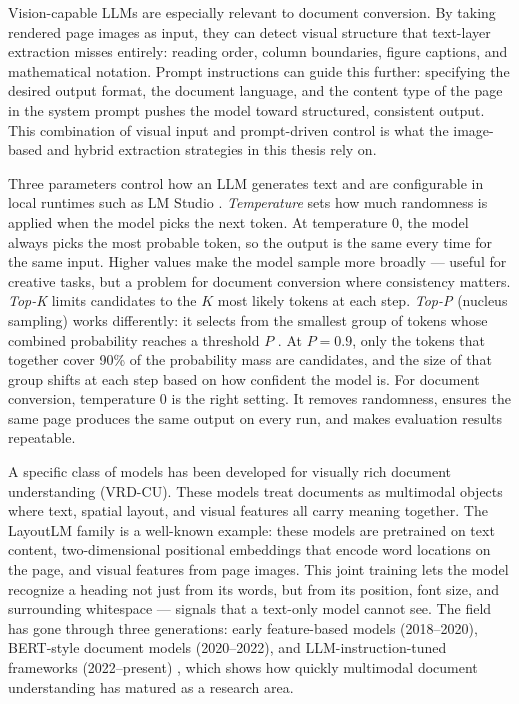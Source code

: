 Vision-capable LLMs are especially relevant to document conversion. By taking
rendered page images as input, they can detect visual structure that text-layer
extraction misses entirely: reading order, column boundaries, figure captions,
and mathematical notation. Prompt instructions can guide this further: specifying the desired output
format, the document language, and the content type of the page in the system
prompt pushes the model toward structured, consistent output. This combination
of visual input and prompt-driven control is what the image-based and hybrid
extraction strategies in this thesis rely on.

Three parameters control how an LLM generates text and are configurable in
local runtimes such as LM Studio \autocite{khan2024}. \textit{Temperature} sets
how much randomness is applied when the model picks the next token. At
temperature 0, the model always picks the most probable token, so the output
is the same every time for the same input. Higher values make the model sample
more broadly --- useful for creative tasks, but a problem for document
conversion where consistency matters. \textit{Top-K} limits candidates to the
$K$ most likely tokens at each step. \textit{Top-P} (nucleus sampling) works
differently: it selects from the smallest group of tokens whose combined
probability reaches a threshold $P$ \autocite{khan2024}. At $P = 0.9$, only the
tokens that together cover 90\% of the probability mass are candidates, and
the size of that group shifts at each step based on how confident the model
is. For document conversion, temperature 0 is the right setting. It removes
randomness, ensures the same page produces the same output on every run, and
makes evaluation results repeatable.

A specific class of models has been developed for visually rich document
understanding (VRD-CU). These models treat documents as multimodal objects
where text, spatial layout, and visual features all carry meaning together.
The LayoutLM family \autocite{ding2026} is a well-known example: these models are
pretrained on text content, two-dimensional positional embeddings that encode
word locations on the page, and visual features from page images. This joint
training lets the model recognize a heading not just from its words, but from
its position, font size, and surrounding whitespace --- signals that a
text-only model cannot see. The field has gone through three generations:
early feature-based models (2018--2020), BERT-style document models
(2020--2022), and LLM-instruction-tuned frameworks (2022--present)
\autocite{ding2026}, which shows how quickly multimodal document understanding
has matured as a research area.

